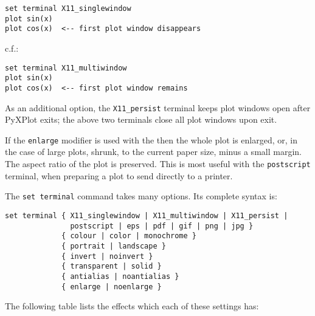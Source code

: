 \begin{verbatim} 
set terminal X11_singlewindow
plot sin(x)
plot cos(x)  <-- first plot window disappears
\end{verbatim}

\noindent c.f.:

\begin{verbatim} 
set terminal X11_multiwindow
plot sin(x)
plot cos(x)  <-- first plot window remains
\end{verbatim}

As an additional option, the {\tt X11\_persist} terminal keeps plot windows
open after PyXPlot exits; the above two terminals close all plot windows upon
exit.

If the {\tt enlarge} modifier is used with the  then the
whole plot is enlarged, or, in the case of large plots, shrunk, to the current
paper size, minus a small margin. The aspect ratio of the plot is preserved.
This is most useful with the {\tt postscript} terminal, when preparing a plot
to send directly to a printer.

The {\tt set terminal} command takes many options. Its complete syntax is:

\begin{verbatim} 
set terminal { X11_singlewindow | X11_multiwindow | X11_persist |
               postscript | eps | pdf | gif | png | jpg }
             { colour | color | monochrome }
             { portrait | landscape }
             { invert | noinvert }
             { transparent | solid }
             { antialias | noantialias }
             { enlarge | noenlarge }
\end{verbatim}

The following table lists the effects which each of these settings has:

